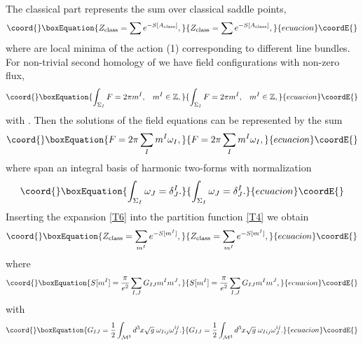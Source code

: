 \documentclass[a4paper,12pt]{article}
\begin{document}
The classical part represents the sum over classical saddle
points,
\begin{equation}\coord{}\boxEquation{\label{T4}
Z_{\rm class}=\sum e^{-S[A_{\rm class}]},
}{Z_{\rm class}=\sum e^{-S[A_{\rm class}]},
}{ecuacion}\coordE{}\end{equation}
where \coordHE{} are local minima of the action (1)
corresponding to different line bundles. For non-trivial second
homology of \coordHE{} we have field configurations with
non-zero flux,
\begin{equation}\coord{}\boxEquation{\label{T5}
\int_{\Sigma_{I}}F = 2 \pi m^{I}, \;\;\; m^{I} \in \mathbb{Z},
}{\int_{\Sigma_{I}}F = 2 \pi m^{I}, \;\;\; m^{I} \in \mathbb{Z},
}{ecuacion}\coordE{}\end{equation}
with \coordHE{}. Then the
solutions of the field equations can be represented by the sum
\begin{equation}\coord{}\boxEquation{\label{T6}
F=2 \pi \sum_{ I } m^{ I } \omega_{ I },
}{F=2 \pi \sum_{ I } m^{ I } \omega_{ I },
}{ecuacion}\coordE{}\end{equation}
where \coordHE{} span an integral basis of harmonic two-forms
with normalization
\begin{equation}\coord{}\boxEquation{\label{T7}
\int_{\Sigma_{ I}} \omega_{J}=\delta_{J}^{I}.
}{\int_{\Sigma_{ I}} \omega_{J}=\delta_{J}^{I}.
}{ecuacion}\coordE{}\end{equation}
Inserting the expansion \eqref{T6} into the partition function \eqref{T4} we obtain
\begin{equation}\coord{}\boxEquation{\label{T8}
Z_{\rm class}=\sum_{m^{I}} e^{- S[m^{I}]},
}{Z_{\rm class}=\sum_{m^{I}} e^{- S[m^{I}]},
}{ecuacion}\coordE{}\end{equation}
where
\begin{equation}\coord{}\boxEquation{\label{T9}
S[m^{I}]=\frac{\pi}{e^{2}} \sum_{I,J} G_{IJ} m^{I} m^{J},
}{S[m^{I}]=\frac{\pi}{e^{2}} \sum_{I,J} G_{IJ} m^{I} m^{J},
}{ecuacion}\coordE{}\end{equation}
with
\begin{equation}\coord{}\boxEquation{\label{T10}
G_{IJ}=\frac{1}{2} \int_{\mathcal{M}^{3}} d^{3}x
\sqrt{g}\; \omega_{Iij}\omega_{J}^{ij}.
}{G_{IJ}=\frac{1}{2} \int_{\mathcal{M}^{3}} d^{3}x
\sqrt{g}\; \omega_{Iij}\omega_{J}^{ij}.
}{ecuacion}\coordE{}\end{equation}
\end{document}
